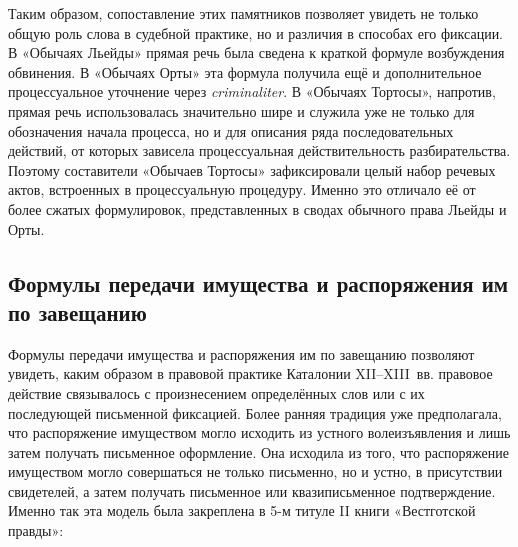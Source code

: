 Таким образом, сопоставление этих памятников позволяет увидеть не только общую роль слова в судебной практике, но и различия в способах его фиксации. В «Обычаях Льейды» прямая речь была сведена к краткой формуле возбуждения обвинения. В «Обычаях Орты» эта формула получила ещё и дополнительное процессуальное уточнение через \emph{criminaliter}. В «Обычаях Тортосы», напротив, прямая речь использовалась значительно шире и служила уже не только для обозначения начала процесса, но и для описания ряда последовательных действий, от которых зависела процессуальная действительность разбирательства. Поэтому составители «Обычаев Тортосы» зафиксировали целый набор речевых актов, встроенных в процессуальную процедуру. Именно это отличало её от более сжатых формулировок, представленных в сводах обычного права Льейды и Орты.

\subsection{Формулы передачи имущества и распоряжения им по завещанию}

Формулы передачи имущества и распоряжения им по завещанию позволяют увидеть, каким образом в правовой практике Каталонии XII--XIII~вв. правовое действие связывалось с произнесением определённых слов или с их последующей письменной фиксацией. Более ранняя традиция уже предполагала, что распоряжение имуществом могло исходить из устного волеизъявления и лишь затем получать письменное оформление. Она исходила из того, что распоряжение имуществом могло совершаться не только письменно, но и устно, в присутствии свидетелей, а затем получать письменное или квазиписьменное подтверждение. Именно так эта модель была закреплена в 5-м титуле II книги «Вестготской правды»:

